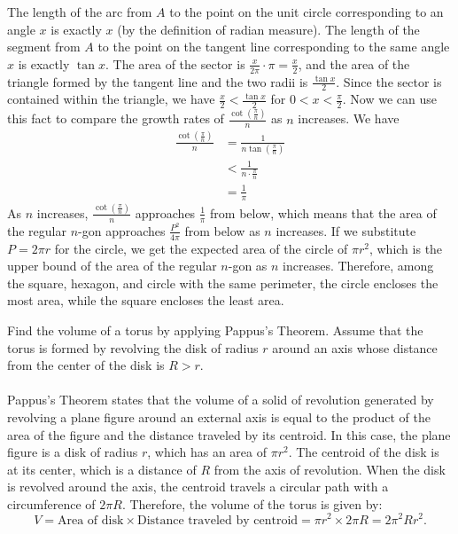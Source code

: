 \documentclass[12pt]{exam}
\begin{document}
\begin{questions}
The length of the arc from $A$ to the point on the unit circle corresponding 
to an angle $x$ is exactly $x$ (by the definition of radian measure).
The length of the segment from $A$ to the point on the tangent line corresponding
to the same angle $x$ is exactly $\tan x$. The area of the sector
is $\frac{x}{2\pi} \cdot \pi = \frac{x}{2}$, 
and the area of the triangle formed by the tangent line 
and the two radii is $\frac{\tan x}{2}$. 
Since the sector is contained within the triangle, 
we have $\frac{x}{2} < \frac{\tan x}{2}$ for $0 < x < \frac{\pi}{2}$.
Now we can use this fact to compare the growth rates 
of $\frac{\cot\left(\frac{\pi}{n}\right)}{n}$ as $n$ increases. 
We have
\begin{align*}
  \frac{\cot\left(\frac{\pi}{n}\right)}{n} &= 
  \frac{1}{n\tan\left(\frac{\pi}{n}\right)}\\
  &< \frac{1}{n \cdot \frac{\pi}{n}}\\
  &= \frac{1}{\pi}
\end{align*}
As $n$ increases, $\frac{\cot\left(\frac{\pi}{n}\right)}{n}$ 
approaches $\frac{1}{\pi}$ from below, 
which means that the area of the regular $n$-gon approaches $\frac{P^2}{4\pi}$ 
from below as $n$ increases. If we substitute $P=2\pi r$ for the circle, 
we get the expected area of the circle of $\pi r^2$, which is the 
upper bound of the area of the regular $n$-gon as $n$ increases.
Therefore, among the square, hexagon, and circle with the same perimeter, 
the circle encloses the most area, while the square encloses the least area.

\newpage 
\question 
Find the volume of a torus by applying Pappus's Theorem. Assume that the torus is formed
by revolving the disk of radius $r$ around an axis whose distance from the center
of the disk is $R > r$.
\\\\
Pappus's Theorem states that the volume of a solid of revolution generated 
by revolving a plane figure around an external axis is equal to the product 
of the area of the figure and the distance traveled by its centroid.
In this case, the plane figure is a disk of radius $r$, 
which has an area of $\pi r^2$. The centroid of the disk is at its center, 
which is a distance of $R$ from the axis of revolution. 
When the disk is revolved around the axis, the centroid travels a circular path 
with a circumference of $2\pi R$.
Therefore, the volume of the torus is given by:
\[
  V = \text{Area of disk} \times \text{Distance traveled by centroid} = \pi r^2 \times 2\pi R = 2\pi^2 R r^2.
\]

\end{questions}
\end{document}
